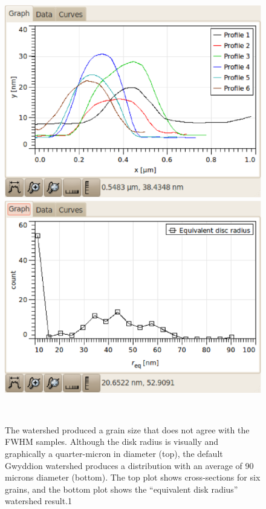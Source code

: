 \documentclass[12pt,oneside,english]{article}
\begin{document}
	\begin{figure}
	\center
	\includegraphics[width=140mm]{images/gwyddion-cross-section-curves.eps}
	\includegraphics[width=140mm]{images/gwyddion-watershed-radius.eps}
	\caption{The watershed produced a grain size that does not agree with the FWHM samples.  Although the disk radius is visually and graphically a quarter-micron in diameter (top), the default Gwyddion watershed produces a distribution with an average of 90 microns diameter (bottom).  The top plot shows cross-sections for six grains, and the bottom plot shows the ``equivalent disk radius'' watershed result.1}\\
	\label{f:gwyXcurves}
	\end{figure}
\end{document}
